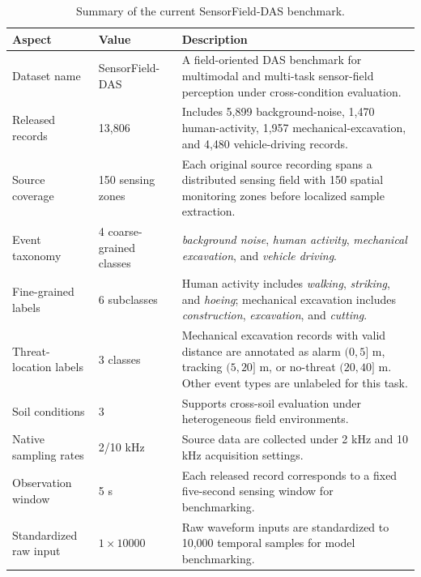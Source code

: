 \begin{table}[t]
\centering
\caption{Summary of the current SensorField-DAS benchmark.}
\label{tab:sensorfield_dataset}
\setlength{\tabcolsep}{5pt}
\renewcommand{\arraystretch}{1.12}
\begin{tabular}{p{3.2cm}p{4.0cm}p{6.1cm}}
\toprule
\textbf{Aspect} & \textbf{Value} & \textbf{Description} \\
\midrule
Dataset name & SensorField-DAS & A field-oriented DAS benchmark for multimodal and multi-task sensor-field perception under cross-condition evaluation. \\

Released records & 13,806 & Includes 5,899 background-noise, 1,470 human-activity, 1,957 mechanical-excavation, and 4,480 vehicle-driving records. \\

Source coverage & 150 sensing zones & Each original source recording spans a distributed sensing field with 150 spatial monitoring zones before localized sample extraction. \\

Event taxonomy & 4 coarse-grained classes & \textit{background noise}, \textit{human activity}, \textit{mechanical excavation}, and \textit{vehicle driving}. \\

Fine-grained labels & 6 subclasses & Human activity includes \textit{walking}, \textit{striking}, and \textit{hoeing}; mechanical excavation includes \textit{construction}, \textit{excavation}, and \textit{cutting}. \\

Threat-location labels & 3 classes & Mechanical excavation records with valid distance are annotated as alarm $(0,5]$ m, tracking $(5,20]$ m, or no-threat $(20,40]$ m. Other event types are unlabeled for this task. \\

Soil conditions & 3 & Supports cross-soil evaluation under heterogeneous field environments. \\

Native sampling rates & 2/10 kHz & Source data are collected under 2 kHz and 10 kHz acquisition settings. \\

Observation window & 5 s & Each released record corresponds to a fixed five-second sensing window for benchmarking. \\

Standardized raw input & $1 \times 10000$ & Raw waveform inputs are standardized to 10,000 temporal samples for model benchmarking. \\


\end{tabular}
\end{table}
